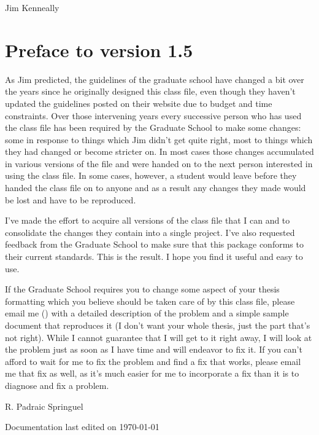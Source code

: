 \begin{preface}
 \begin{flushright}
 Jim Kenneally
 \end{flushright}
 
\section{Preface to version 1.5}
As Jim predicted, the guidelines of the graduate school have changed a bit over the years since he originally designed this class file, even though they haven't updated the guidelines posted on their website due to budget and time constraints.  Over those intervening years every successive person who has used the class file has been required by the Graduate School to make some changes: some in response to things which Jim didn't get quite right, most to things which they had changed or become stricter on.  In most cases those changes accumulated in various versions of the file and were handed on to the next person interested in using the class file.  In some cases, however, a student would leave before they handed the class file on to anyone and as a result any changes they made would be lost and have to be reproduced.

I've made the effort to acquire all versions of the class file that I can and to consolidate the changes they contain into a single project.  I've also requested feedback from the Graduate School to make sure that this package conforms to their current standards.  This is the result.  I hope you find it useful and easy to use.

If the Graduate School requires you to change some aspect of your thesis formatting which you believe should be taken care of by this class file, please email me (\email) with a detailed description of the problem and a simple sample document that reproduces it (I don't want your whole thesis, just the part that's not right).  While I cannot guarantee that I will get to it right away, I will look at the problem just as soon as I have time and will endeavor to fix it.  If you can't afford to wait for me to fix the problem and find a fix that works, please email me that fix as well, as it's much easier for me to incorporate a fix than it is to diagnose and fix a problem.

\begin{flushright}
R. Padraic Springuel

Documentation last edited on \today
\end{flushright}

\end{preface}


